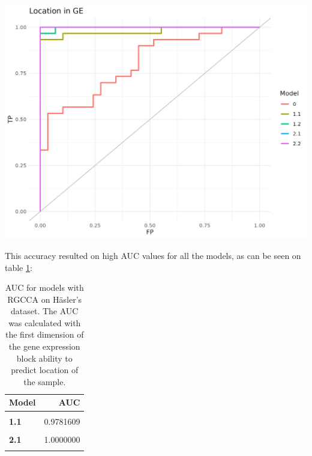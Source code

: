 \documentclass[
  a4paper,
]{book}
\let\origfigure\figure
\let\endorigfigure\endfigure
\renewenvironment{figure}[1][2] {
    \expandafter\origfigure\expandafter[!ht]
} {
    \endorigfigure
}
\begin{document}
\begin{figure}
\includegraphics[width=1\linewidth]{images/hasler-auc} \caption[AUC for models with RGCCA on Häsler's dataset]{AUC for models with RGCCA on Häsler's dataset. The AUC was calculated with the first dimension of the gene expression block ability to predict location of the sample.}\label{fig:hasler-auc-plot}
\end{figure}

This accuracy resulted on high AUC values for all the models, as can be seen on table \ref{tab:hasler-auc}:

\begin{table}[H]

\caption[AUC for models with RGCCA on Häsler's dataset]{\label{tab:hasler-auc}AUC for models with RGCCA on Häsler's dataset. The AUC was calculated with the first dimension of the gene expression block ability to predict location of the sample.}
\centering
\begin{tabular}[t]{>{}l||r}
\hline
Model & AUC\\
\hline
\textbf{\cellcolor{gray!6}{0}} & \cellcolor{gray!6}{0.8011494}\\
\hline
\textbf{1.1} & 0.9781609\\
\hline
\textbf{\cellcolor{gray!6}{1.2}} & \cellcolor{gray!6}{0.9977011}\\
\hline
\textbf{2.1} & 1.0000000\\
\hline
\textbf{\cellcolor{gray!6}{2.2}} & \cellcolor{gray!6}{1.0000000}\\
\hline
\end{tabular}
\end{table}
\end{document}
